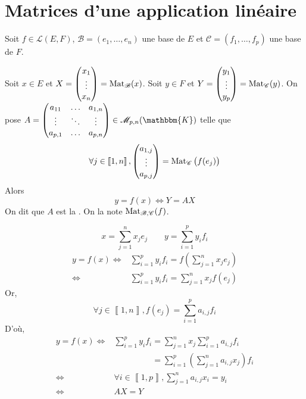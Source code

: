 \part{Matrices d'une application linéaire}

Soit $f \in \mathcal{L}(E,F)$, $\mathcal{B} = (e_1, \ldots, e_n)$ une base de $E$ et $\mathcal{C} = (f_1, \ldots, f_p)$ une base de $F$.
\vspace{5mm}

\begin{prop-defn}
	Soit $x \in E$ et $X = \begin{pmatrix}
		x_1\\
		\vdots\\
		x_n
	\end{pmatrix} = \operatorname{Mat}_\mathcal{B}(x)$. Soit $y \in F$ et $Y = \begin{pmatrix}
		y_1\\
		\vdots\\
		y_p
	\end{pmatrix} = \operatorname{Mat}_\mathcal{C}(y)$. On pose $A = \begin{pmatrix}
		a_{11}&\ldots&a_{1,n}\\
		\vdots&\ddots&\vdots\\
		a_{p,1}&\ldots&a_{p,n}
	\end{pmatrix} \in \mathcal{M}_{p,n}(\mathbbm{K})$ telle que \[
		\forall j \in \left\llbracket 1,n \right\rrbracket, \begin{pmatrix}
			a_{1,j}\\
			\vdots\\
			a_{p,j}
		\end{pmatrix} = \operatorname{Mat}_\mathcal{C}\big(f(e_j)\big)
	\] Alors \[
		y = f(x) \iff Y = AX
	\] On dit que $A$ est la . On la note $\operatorname{Mat}_{\mathcal{B},\mathcal{C}}(f)$.
\end{prop-defn}

\begin{prv}
	\[
		x = \sum_{j=1}^n x_j e_j \qquad y = \sum_{i=1}^p y_i f_i
	\]
	\begin{align*}
		y = f(x) \iff& \sum_{i=1}^p y_i f_i = f\left( \sum_{j=1}^n x_j e_j \right)\\
		\iff& \sum_{i=1}^p y_i f_i = \sum_{j=1}^n x_j f(e_j)
	\end{align*}
	Or, \[
		\forall j \in \left\llbracket 1,n \right\rrbracket, f(e_j) = \sum_{i=1}^p a_{i,j} f_i
	\] D'où,
	\begin{align*}
		y = f(x) \iff& \sum_{i=1}^p y_i f_i = \sum_{j=1}^n x_j \sum_{i = 1}^p a_{i,j}f_i\\
		&\phantom{\sum_{i=1}^p y_i f_i} = \sum_{i=1}^p \left( \sum_{j=1}^n a_{i,j}x_j \right) f_i\\
		\iff& \forall i \in \left\llbracket 1,p \right\rrbracket, \sum_{j=1}^n a_{i,j} x_i = y_i\\
		\iff& AX = Y
	\end{align*}
\end{prv}

